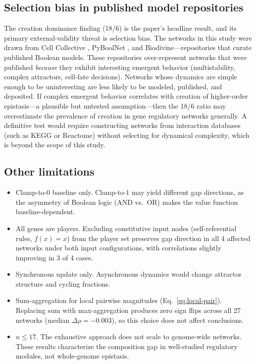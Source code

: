 \documentclass[11pt]{article}
\begin{document}
\subsection{Selection bias in published model repositories}

The creation dominance finding (18/6) is the paper's headline result,
and its primary external-validity threat is selection bias.
The networks in this study were drawn from Cell Collective
\citep{helikar2012cell}, PyBoolNet \citep{klarner2017pyboolnet}, and
Biodivine---repositories that curate published Boolean models. These
repositories over-represent networks that were published \emph{because}
they exhibit interesting emergent behavior (multistability, complex
attractors, cell-fate decisions). Networks whose dynamics are simple
enough to be uninteresting are less likely to be modeled, published,
and deposited. If complex emergent behavior correlates with creation
of higher-order epistasis---a plausible but untested assumption---then
the 18/6 ratio may overestimate the prevalence of creation in gene
regulatory networks generally. A definitive test would require
constructing networks from interaction databases (such as KEGG or
Reactome) without selecting for dynamical complexity, which is beyond
the scope of this study.

\subsection{Other limitations}

\begin{itemize}
\item Clamp-to-0 baseline only. Clamp-to-1 may yield different gap
  directions, as the asymmetry of Boolean logic (AND vs.\ OR) makes
  the value function baseline-dependent.
\item All genes are players. Excluding constitutive input nodes
  (self-referential rules, $f(x) = x$) from the player set preserves
  gap direction in all 4 affected networks under both input
  configurations, with correlations slightly improving in 3 of 4
  cases.
\item Synchronous update only. Asynchronous dynamics would change
  attractor structure and cycling fractions.
\item Sum-aggregation for local pairwise magnitudes
  (Eq.~\ref{eq:local-pair}). Replacing sum with max-aggregation
  produces zero sign flips across all 27 networks (median $\Delta\rho
  = -0.003$), so this choice does not affect conclusions.
\item $n \leq 17$. The exhaustive approach does not scale to
  genome-wide networks. These results characterize the composition
  gap in well-studied regulatory modules, not whole-genome epistasis.
\end{itemize}
\end{document}
